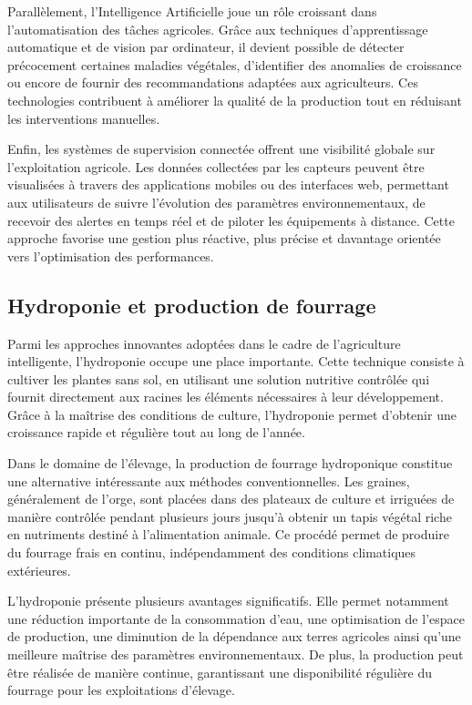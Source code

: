 Parallèlement, l’Intelligence Artificielle joue un rôle croissant dans l’automatisation des tâches agricoles. Grâce aux techniques d’apprentissage automatique et de vision par ordinateur, il devient possible de détecter précocement certaines maladies végétales, d’identifier des anomalies de croissance ou encore de fournir des recommandations adaptées aux agriculteurs. Ces technologies contribuent à améliorer la qualité de la production tout en réduisant les interventions manuelles.

Enfin, les systèmes de supervision connectée offrent une visibilité globale sur l’exploitation agricole. Les données collectées par les capteurs peuvent être visualisées à travers des applications mobiles ou des interfaces web, permettant aux utilisateurs de suivre l’évolution des paramètres environnementaux, de recevoir des alertes en temps réel et de piloter les équipements à distance. Cette approche favorise une gestion plus réactive, plus précise et davantage orientée vers l’optimisation des performances.

\subsection{Hydroponie et production de fourrage}

Parmi les approches innovantes adoptées dans le cadre de l’agriculture intelligente, l’hydroponie occupe une place importante. Cette technique consiste à cultiver les plantes sans sol, en utilisant une solution nutritive contrôlée qui fournit directement aux racines les éléments nécessaires à leur développement. Grâce à la maîtrise des conditions de culture, l’hydroponie permet d’obtenir une croissance rapide et régulière tout au long de l’année.

Dans le domaine de l’élevage, la production de fourrage hydroponique constitue une alternative intéressante aux méthodes conventionnelles. Les graines, généralement de l’orge, sont placées dans des plateaux de culture et irriguées de manière contrôlée pendant plusieurs jours jusqu’à obtenir un tapis végétal riche en nutriments destiné à l’alimentation animale. Ce procédé permet de produire du fourrage frais en continu, indépendamment des conditions climatiques extérieures.

L’hydroponie présente plusieurs avantages significatifs. Elle permet notamment une réduction importante de la consommation d’eau, une optimisation de l’espace de production, une diminution de la dépendance aux terres agricoles ainsi qu’une meilleure maîtrise des paramètres environnementaux. De plus, la production peut être réalisée de manière continue, garantissant une disponibilité régulière du fourrage pour les exploitations d’élevage.


